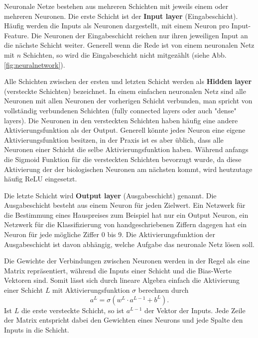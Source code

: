 Neuronale Netze bestehen aus mehreren Schichten mit jeweils einem oder mehreren Neuronen. Die erste Schicht ist der \textbf{Input layer} (Eingabeschicht). Häufig werden die Inputs als Neuronen dargestellt, mit einem Neuron pro Input-Feature. Die Neuronen der Eingabeschicht reichen nur ihren jeweiligen Input an die nächste Schicht weiter. Generell wenn die Rede ist von einem neuronalen Netz mit $n$ Schichten, so wird die Eingabeschicht nicht mitgezählt (siehe Abb. \ref{fig:neuralnetwork}).
\par 
Alle Schichten zwischen der ersten und letzten Schicht werden als \textbf{Hidden layer} (versteckte Schichten) bezeichnet. In einem einfachen neuronalen Netz sind alle Neuronen mit allen Neuronen der vorherigen Schicht verbunden, man spricht von vollständig verbundenen Schichten (fully connected layers oder auch "dense" layers). Die Neuronen in den versteckten Schichten haben häufig eine andere Aktivierungsfunktion als der Output. Generell könnte jedes Neuron eine eigene Aktivierungsfunktion besitzen, in der Praxis ist es aber üblich, dass alle Neuronen einer Schicht die selbe Aktivierungsfunktion haben. Während anfangs die Sigmoid Funktion für die versteckten Schichten bevorzugt wurde, da diese Aktivierung der der biologischen Neuronen am nächsten kommt, wird heutzutage häufig ReLU eingesetzt.
\par 
Die letzte Schicht wird \textbf{Output layer} (Ausgabeschicht) genannt. Die Ausgabeschicht besteht aus einem Neuron für jeden Zielwert. Ein Netzwerk für die Bestimmung eines Hauspreises zum Beispiel hat nur ein Output Neuron, ein Netzwerk für die Klassifizierung von handgeschriebenen Ziffern dagegen hat ein Neuron für jede mögliche Ziffer 0 bis 9. Die Aktivierungsfunktion der Ausgabeschicht ist davon abhängig, welche Aufgabe das neuronale Netz lösen soll.\\
\par 
Die Gewichte der Verbindungen zwischen Neuronen werden in der Regel als eine Matrix repräsentiert, während die Inputs einer Schicht und die Bias-Werte Vektoren sind. Somit lässt sich durch lineare Algebra einfach die Aktivierung einer Schicht $L$ mit Aktivierungsfunktion $\sigma$ berechnen durch
\begin{equation}
	a^L = \sigma(w^L\cdot a^{L-1} + b^L).
\end{equation}
Ist $L$ die erste versteckte Schicht, so ist $a^{L-1}$ der Vektor der Inputs. Jede Zeile der Matrix entspricht dabei den Gewichten eines Neurons und jede Spalte den Inputs in die Schicht.\\

